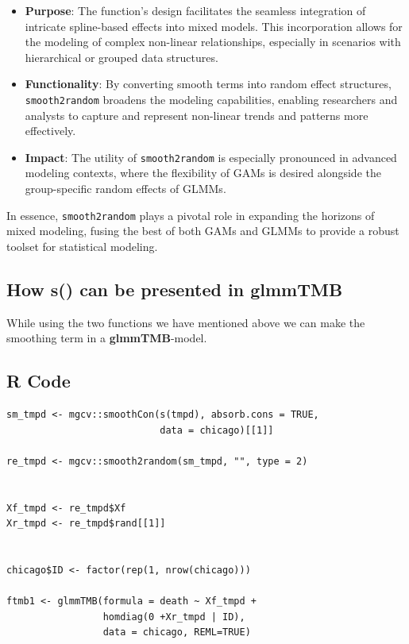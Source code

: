 \documentclass[12pt, twoside,hidelinks]{article}
\theoremstyle{definition}
\numberwithin{equation}{section}
\begin{document}
\begin{itemize}
    \item \textbf{Purpose}: The function's design facilitates the seamless integration of intricate spline-based effects into mixed models. This incorporation allows for the modeling of complex non-linear relationships, especially in scenarios with hierarchical or grouped data structures.
    
    \item \textbf{Functionality}: By converting smooth terms into random effect structures, \texttt{smooth2random} broadens the modeling capabilities, enabling researchers and analysts to capture and represent non-linear trends and patterns more effectively.
    
    \item \textbf{Impact}: The utility of \texttt{smooth2random} is especially pronounced in advanced modeling contexts, where the flexibility of GAMs is desired alongside the group-specific random effects of GLMMs.
\end{itemize}

In essence, \texttt{smooth2random} plays a pivotal role in expanding the horizons of mixed modeling, fusing the best of both GAMs and GLMMs to provide a robust toolset for statistical modeling.

\newpage




\subsection{How s() can be presented in \textbf{glmmTMB}}

While using the two functions we have mentioned above we can make the smoothing term in a \textbf{glmmTMB}-model.
\subsection*{R Code}

\begin{verbatim}
sm_tmpd <- mgcv::smoothCon(s(tmpd), absorb.cons = TRUE, 
                           data = chicago)[[1]]
                           
re_tmpd <- mgcv::smooth2random(sm_tmpd, "", type = 2)


Xf_tmpd <- re_tmpd$Xf
Xr_tmpd <- re_tmpd$rand[[1]]


chicago$ID <- factor(rep(1, nrow(chicago)))

ftmb1 <- glmmTMB(formula = death ~ Xf_tmpd +
                 homdiag(0 +Xr_tmpd | ID), 
                 data = chicago, REML=TRUE)
\end{verbatim}
\end{document}
